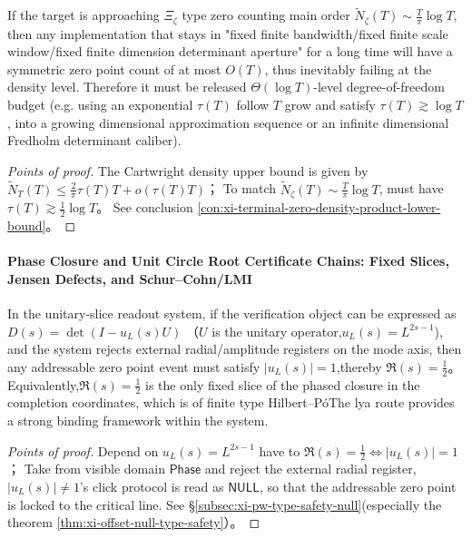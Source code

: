 \begin{conclusion}\label{con:xi-finite-dimension-dirichlet-logT-threshold}
If the target is approaching \(\Xi_\zeta\) type zero counting main order \(\widetilde N_\zeta(T)\sim \tfrac{T}{\pi}\log T\), then any implementation that stays in "fixed finite bandwidth/fixed finite scale window/fixed finite dimension determinant aperture" for a long time will have a symmetric zero point count of at most \(O(T)\), thus inevitably failing at the density level.
Therefore it must be released \(\Theta(\log T)\)-level degree-of-freedom budget (e.g. using an exponential \(\tau(T)\) follow \(T\) grow and satisfy \(\tau(T)\gtrsim \log T\), into a growing dimensional approximation sequence or an infinite dimensional Fredholm determinant caliber).
\end{conclusion}
\begin{proof}[Points of proof]
The Cartwright density upper bound is given by \(\widetilde N_T(T)\le \frac{2}{\pi}\tau(T)T+o(\tau(T)T)\)；
To match \(\widetilde N_\zeta(T)\sim \frac{T}{\pi}\log T\), must have \(\tau(T)\gtrsim \frac12\log T\)。
See conclusion \ref{con:xi-terminal-zero-density-product-lower-bound}。
\end{proof}

\paragraph{Phase Closure and Unit Circle Root Certificate Chains: Fixed Slices, Jensen Defects, and Schur--Cohn/LMI}

\begin{conclusion}[Unique fixed slice of phasing closure: zero point is institutionally locked at when external radial registers are rejected \texorpdfstring{$\Re(s)=\tfrac12$}{Re(s)=1/2}]\label{con:xi-unitary-slice-unique-fixed-slice}
In the unitary-slice readout system, if the verification object can be expressed as
\(
D(s)=\det(I-u_L(s)U)
\)
（\(U\) is the unitary operator,\(u_L(s)=L^{2s-1}\)), and the system rejects external radial/amplitude registers on the mode axis, then any addressable zero point event must satisfy \(|u_L(s)|=1\),thereby \(\Re(s)=\tfrac12\)。
Equivalently,\(\Re(s)=\tfrac12\) is the only fixed slice of the phased closure in the completion coordinates, which is of finite type Hilbert--P{\'o}The lya route provides a strong binding framework within the system.
\end{conclusion}
\begin{proof}[Points of proof]
Depend on \(u_L(s)=L^{2s-1}\) have to \(\Re(s)=\tfrac12\Longleftrightarrow |u_L(s)|=1\)；
Take from visible domain \(\mathsf{Phase}\) and reject the external radial register,\(|u_L(s)|\neq 1\)'s click protocol is read as \(\mathsf{NULL}\), so that the addressable zero point is locked to the critical line.
See \S\ref{subsec:xi-pw-type-safety-null}(especially the theorem \ref{thm:xi-offset-null-type-safety}）。
\end{proof}


